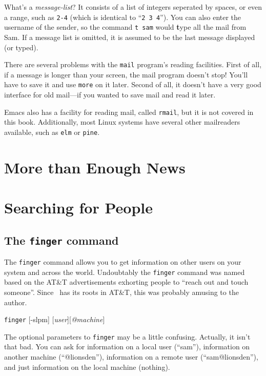 What's a {\sl message-list}? It consists of a list of integers
seperated by spaces, or even a range, such as {\tt 2-4} (which is
identical to ``{\tt 2 3 4}''). You can also enter the username of the
sender, so the command {\tt t sam} would {\bf t}ype all the mail from
Sam. If a message list is omitted, it is assumed to be the last
message displayed (or typed).

There are several problems with the {\tt mail} program's reading
facilities. First of all, if a message is longer than your screen, the
mail program doesn't stop! You'll have to save it and use {\tt more}
on it later. Second of all, it doesn't have a very good interface for
old mail---if you wanted to save mail and read it later.

Emacs also has a facility for reading mail, called {\tt rmail}, but it
is not covered in this book. Additionally, most Linux systems have
several other mailreaders available, such as {\tt elm} or
{\tt pine}.


\section{More than Enough News}


\section{Searching for People}

\subsection{The {\tt finger} command}

The {\tt finger} command allows you to get information on other users
on your system and across the world.  Undoubtably the {\tt finger}
command was named based on the AT\&T advertisements
exhorting people to ``reach out and touch someone''.  Since \unix\ has
its roots in AT\&T, this was probably amusing to the author.

\begin{command}
  {\tt finger} [-slpm] [{\sl user}][{\sl @machine}]
\end{command}

The optional parameters to {\tt finger} may be a little
confusing. Actually, it isn't that bad. You can ask for information on
a local user (``sam''), information on another machine
(``@lionsden''), information on a remote user (``sam@lionsden''), and
just information on the local machine (nothing).

